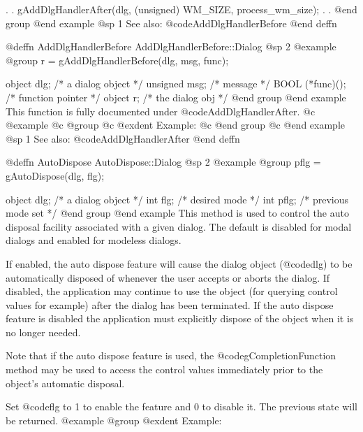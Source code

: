        .
        .
        gAddDlgHandlerAfter(dlg, (unsigned) WM_SIZE,
                                      process_wm_size);
        .
        .
@end group
@end example
@sp 1
See also:  @code{AddDlgHandlerBefore}
@end deffn












@deffn {AddDlgHandlerBefore} AddDlgHandlerBefore::Dialog
@sp 2
@example
@group
r = gAddDlgHandlerBefore(dlg, msg, func);

object   dlg;     /*  a dialog object  */
unsigned msg;      /*  message          */
BOOL    (*func)(); /*  function pointer */
object  r;         /*  the dialog obj   */
@end group
@end example
This function is fully documented under @code{AddDlgHandlerAfter}.
@c @example
@c @group
@c @exdent Example:
@c @end group
@c @end example
@sp 1
See also:  @code{AddDlgHandlerAfter}
@end deffn













@deffn {AutoDispose} AutoDispose::Dialog
@sp 2
@example
@group
pflg = gAutoDispose(dlg, flg);

object  dlg;    /*  a dialog object    */
int     flg;    /*  desired mode       */
int     pflg;   /*  previous mode set  */
@end group
@end example
This method is used to control the auto disposal facility associated with
a given dialog.  The default is disabled for modal dialogs and enabled
for modeless dialogs.

If enabled, the auto dispose feature will cause the dialog object
(@code{dlg}) to be automatically disposed of whenever the user accepts
or aborts the dialog.  If disabled, the application may continue to use
the object (for querying control values for example) after the dialog
has been terminated.  If the auto dispose feature is disabled the
application must explicitly dispose of the object when it is no longer
needed.

Note that if the auto dispose feature is used, the @code{gCompletionFunction}
method may be used to access the control values immediately prior to
the object's automatic disposal.

Set @code{flg} to 1 to enable the feature and 0 to disable it.  The
previous state will be returned.
@example
@group
@exdent Example:

